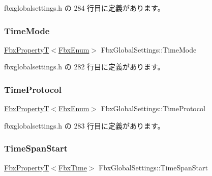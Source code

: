  fbxglobalsettings.\+h の 284 行目に定義があります。

\mbox{\label{class_fbx_global_settings_a0bb2b74ae4ea617f08d00b368f5d7c8d}} 
\subsubsection{\texorpdfstring{Time\+Mode}{TimeMode}}
{\footnotesize\ttfamily \hyperlink{class_fbx_property_t}{Fbx\+PropertyT}$<$\hyperlink{fbxtypes_8h_a9a28614cb4272a0ad7d748eda7f3d3e5}{Fbx\+Enum}$>$ Fbx\+Global\+Settings\+::\+Time\+Mode\hspace{0.3cm}{\ttfamily [protected]}}



 fbxglobalsettings.\+h の 282 行目に定義があります。

\mbox{\label{class_fbx_global_settings_aa210c0c36889f764b53066082ca5452a}} 
\subsubsection{\texorpdfstring{Time\+Protocol}{TimeProtocol}}
{\footnotesize\ttfamily \hyperlink{class_fbx_property_t}{Fbx\+PropertyT}$<$\hyperlink{fbxtypes_8h_a9a28614cb4272a0ad7d748eda7f3d3e5}{Fbx\+Enum}$>$ Fbx\+Global\+Settings\+::\+Time\+Protocol\hspace{0.3cm}{\ttfamily [protected]}}



 fbxglobalsettings.\+h の 283 行目に定義があります。

\mbox{\label{class_fbx_global_settings_a58fe5bbda2ad6c833cec07c3ca158aba}} 
\subsubsection{\texorpdfstring{Time\+Span\+Start}{TimeSpanStart}}
{\footnotesize\ttfamily \hyperlink{class_fbx_property_t}{Fbx\+PropertyT}$<$\hyperlink{class_fbx_time}{Fbx\+Time}$>$ Fbx\+Global\+Settings\+::\+Time\+Span\+Start\hspace{0.3cm}{\ttfamily [protected]}}



